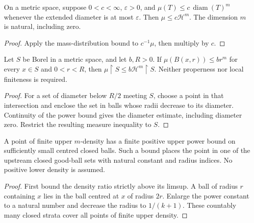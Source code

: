 \begin{lemma}
\label{lem:diameter-hausdorff-bound}
On a metric space, suppose $0<c<\infty$, $\varepsilon>0$, and
$\mu(T)\le c\,\operatorname{diam}(T)^m$ whenever the extended diameter
is at most $\varepsilon$. Then $\mu\le c\mathcal H^m$.
The dimension $m$ is natural, including zero.
\end{lemma}
\begin{proof}
Apply the mass-distribution bound to $c^{-1}\mu$, then multiply by $c$.
\end{proof}

\begin{lemma}
\label{lem:ball-upper-hausdorff-bound}
Let $S$ be Borel in a metric space, and let $b,R>0$. If
$\mu(B(x,r))\le b r^m$ for every $x\in S$ and $0<r<R$, then
$\mu\restriction S\le b\mathcal H^m\restriction S$.
Neither properness nor local finiteness is required.
\end{lemma}
\begin{proof}
For a set of diameter below $R/2$ meeting $S$, choose a point in that
intersection and enclose the set in balls whose radii decrease to its diameter.
Continuity of the power bound gives the diameter estimate, including diameter
zero. Restrict the resulting measure inequality to $S$.
\end{proof}

\begin{lemma}
\label{lem:upper-density-localization}
A point of finite upper $m$-density has a finite positive upper power bound
on sufficiently small centred closed balls. Such a bound places the point
in one of the upstream closed good-ball sets with natural constant and radius
indices. No positive lower density is assumed.
\end{lemma}
\begin{proof}
First bound the density ratio strictly above its limsup. A ball of radius $r$
containing $x$ lies in the ball centred at $x$ of radius $2r$. Enlarge the
power constant to a natural number and decrease the radius to $1/(k+1)$.
These countably many closed strata cover all points of finite upper density.
\end{proof}

